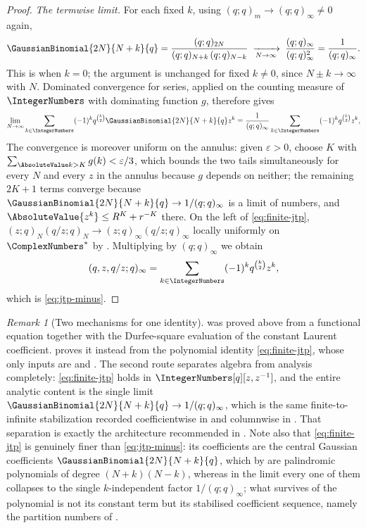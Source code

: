 \documentclass[11pt,a4paper,oneside,openany]{book}
\theoremstyle{definition}
\theoremstyle{remark}
\newtheorem{remark}[remark]{Remark}
\newcommand{\eps}{\varepsilon}
\begin{document}
\begin{proof}
\emph{The termwise limit.}  For each fixed $k$, using $(q;q)_m\to(q;q)_\infty\ne0$ again,
\[
 \GaussianBinomial{2N}{N+k}{q}
 =\frac{(q;q)_{2N}}{(q;q)_{N+k}\,(q;q)_{N-k}}
 \;\xrightarrow[N\to\infty]{}\;
 \frac{(q;q)_\infty}{(q;q)_\infty^{2}}
 =\frac1{(q;q)_\infty}.
\]
This is  when $k=0$; the argument is unchanged for
fixed $k\ne0$, since $N\pm k\to\infty$ with $N$.
Dominated convergence for series, applied on the counting measure of $\IntegerNumbers$ with dominating function $g$, therefore gives
\[
 \lim_{N\to\infty}\sum_{k\in\IntegerNumbers}(-1)^kq^{\binom k2}
 \GaussianBinomial{2N}{N+k}{q}z^{k}
 =\frac1{(q;q)_\infty}\sum_{k\in\IntegerNumbers}(-1)^kq^{\binom k2}z^{k},
\]
The convergence is moreover uniform on the annulus: given $\eps>0$, choose $K$ with $\sum_{\AbsoluteValue k>K}g(k)<\eps/3$, which bounds the two tails simultaneously for every $N$ and every $z$ in the annulus because $g$ depends on neither; the remaining $2K+1$ terms converge because $\GaussianBinomial{2N}{N+k}{q}\to1/(q;q)_\infty$ is a limit of numbers, and $\AbsoluteValue{z^k}\le R^{K}+r^{-K}$ there.  On the left of \eqref{eq:finite-jtp}, $(z;q)_N(q/z;q)_N\to(z;q)_\infty(q/z;q)_\infty$ locally uniformly on $\ComplexNumbers^{*}$ by .  Multiplying by $(q;q)_\infty$ we obtain
\[
 (q,z,q/z;q)_\infty
 =\sum_{k\in\IntegerNumbers}(-1)^kq^{\binom k2}z^{k},
\]
which is \eqref{eq:jtp-minus}.
\end{proof}

\begin{remark}[Two mechanisms for one identity]\label{rem:jtp-two-proofs}
 was proved above from a functional equation together with the Durfee-square evaluation of the constant Laurent coefficient.   proves it instead from the polynomial identity \eqref{eq:finite-jtp}, whose only inputs are  and .  The second route separates algebra from analysis completely: \eqref{eq:finite-jtp} holds in $\IntegerNumbers[q][z,z^{-1}]$, and the entire analytic content is the single limit $\GaussianBinomial{2N}{N+k}{q}\to1/(q;q)_\infty$, which is the same finite-to-infinite stabilization recorded coefficientwise in  and columnwise in .  That separation is exactly the architecture recommended in .  Note also that \eqref{eq:finite-jtp} is genuinely finer than \eqref{eq:jtp-minus}: its coefficients are the central Gaussian coefficients $\GaussianBinomial{2N}{N+k}{q}$, which by  are palindromic polynomials of degree $(N+k)(N-k)$, whereas in the limit every one of them collapses to the single $k$-independent factor $1/(q;q)_\infty$; what survives of the polynomial is not its constant term but its stabilised coefficient sequence, namely the partition numbers of .
\end{remark}
\end{document}
